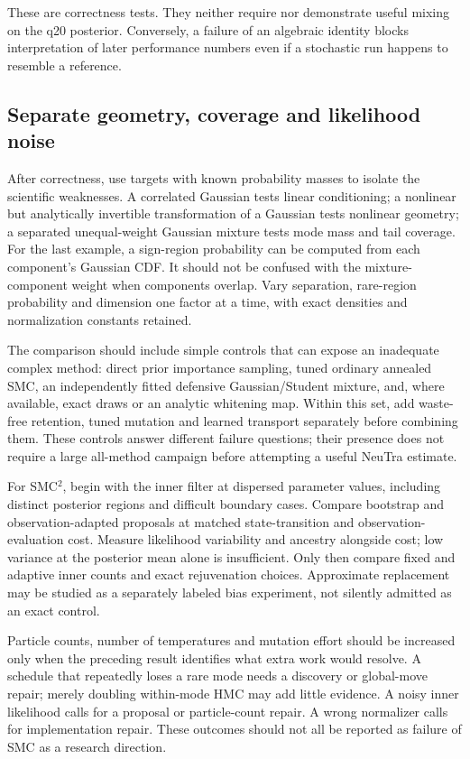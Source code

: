 These are correctness tests. They neither require nor demonstrate useful
mixing on the q20 posterior. Conversely, a failure of an algebraic identity
blocks interpretation of later performance numbers even if a stochastic
run happens to resemble a reference.

\subsection{Separate geometry, coverage and likelihood noise}

After correctness, use targets with known probability masses to isolate the
scientific weaknesses. A correlated Gaussian tests linear conditioning; a
nonlinear but analytically invertible transformation of a Gaussian tests
nonlinear geometry; a separated unequal-weight Gaussian mixture tests
mode mass and tail coverage. For the last example, a sign-region probability
can be computed from each component's Gaussian CDF. It should not be
confused with the mixture-component weight when components overlap.
Vary separation, rare-region probability and dimension one factor at a
time, with exact densities and normalization constants retained.

The comparison should include simple controls that can expose an inadequate
complex method: direct prior importance sampling, tuned ordinary annealed
SMC, an independently fitted defensive Gaussian/Student mixture, and, where
available, exact draws or an analytic whitening map. Within this set, add
waste-free retention, tuned mutation and learned transport separately before
combining them. These controls answer different failure questions; their
presence does not require a large all-method campaign before attempting a
useful NeuTra estimate.

For SMC$^2$, begin with the inner filter at dispersed parameter values,
including distinct posterior regions and difficult boundary cases. Compare
bootstrap and observation-adapted proposals at matched state-transition
and observation-evaluation cost. Measure likelihood variability and ancestry
alongside cost; low variance at the posterior mean alone is insufficient.
Only then compare fixed and adaptive inner counts and exact rejuvenation
choices. Approximate replacement may be studied as a separately labeled
bias experiment, not silently admitted as an exact control.

Particle counts, number of temperatures and mutation effort should be
increased only when the preceding result identifies what extra work would
resolve. A schedule that repeatedly loses a rare mode needs a discovery or
global-move repair; merely doubling within-mode HMC may add little evidence.
A noisy inner likelihood calls for a proposal or particle-count repair.
A wrong normalizer calls for implementation repair. These outcomes should
not all be reported as failure of SMC as a research direction.

